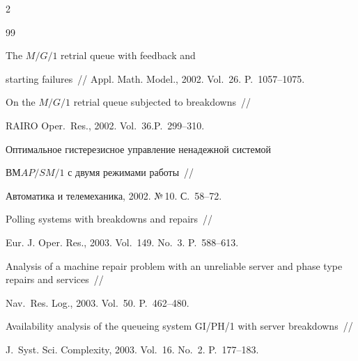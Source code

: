 \begin{multicols}{2}
{{\begin{thebibliography}{99}


The $M/G/1$ retrial queue with feedback and


starting failures~// Appl. Math. Model., 2002. Vol.~26. P.~1057--1075.









On the $M/G/1$ retrial queue subjected to breakdowns~//


RAIRO Oper.\ Res., 2002. Vol.~36.\linebreak P.~299--310.









Оптимальное гистерезисное управление ненадежной системой


$ВМAP/SM/1$ с двумя режимами работы~//


Автоматика и телемеханика, 2002. №\,10. С.~58--72.









Polling systems with breakdowns and repairs~//


Eur. J. Oper. Res., 2003. Vol.~149. No.~3. P.~588--613.









Analysis of a machine repair problem with an unreliable server and phase type repairs and services~//


Nav.\ Res. Log., 2003. Vol.~50. P.~462--480.









Availability analysis of the queueing system GI/PH/1 with server breakdowns~//


J.\ Syst. Sci. Complexity, 2003. Vol.~16. No.~2. P.~177--183.






\end{thebibliography}}}
\end{multicols}
